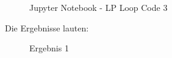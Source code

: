 \documentclass[a4paper]{report}
\begin{document}
\begin{figure}[H]
\centering
{}
\caption{Jupyter Notebook -  LP Loop Code 3}
\label{fig:LOOP3}
\end{figure}

 Die  Ergebnisse lauten: 
 
 \begin{figure}[H]
\centering
{}
\caption{Ergebnis 1}
\label{fig:Ergebnis_1}
\end{figure}
\end{document}
